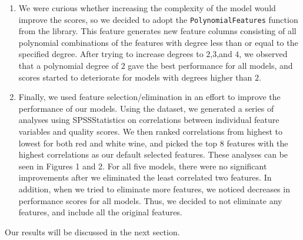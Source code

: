 \begin{enumerate}
    \item We were curious whether increasing the complexity of the model would improve the scores, so we decided to adopt the \texttt{PolynomialFeatures} function from the  library. This feature generates new feature columns consisting of all polynomial combinations of the features with degree less than or equal to the specified degree. After trying to increase degrees to $2$,$3$,and $4$, we observed that a polynomial degree of $2$ gave the best performance for all models, and scores started to deteriorate for models with degrees higher than $2$.
    \item Finally, we used feature selection/elimination in an effort to improve the performance of our models. Using the dataset, we generated a series of analyses using SPSSStatistics on correlations between individual feature variables and quality scores. We then ranked correlations from highest to lowest for both red and white wine, and picked the top $8$ features with the highest correlations as our default selected features. These analyses can be seen in Figures 1 and 2. For all five models, there were no significant improvements after we eliminated the least correlated two features. In addition, when we tried to eliminate more features, we noticed decreases in performance scores for all models. Thus, we decided to not eliminate any features, and include all the original features.
\end{enumerate}

Our results will be discussed in the next section.
